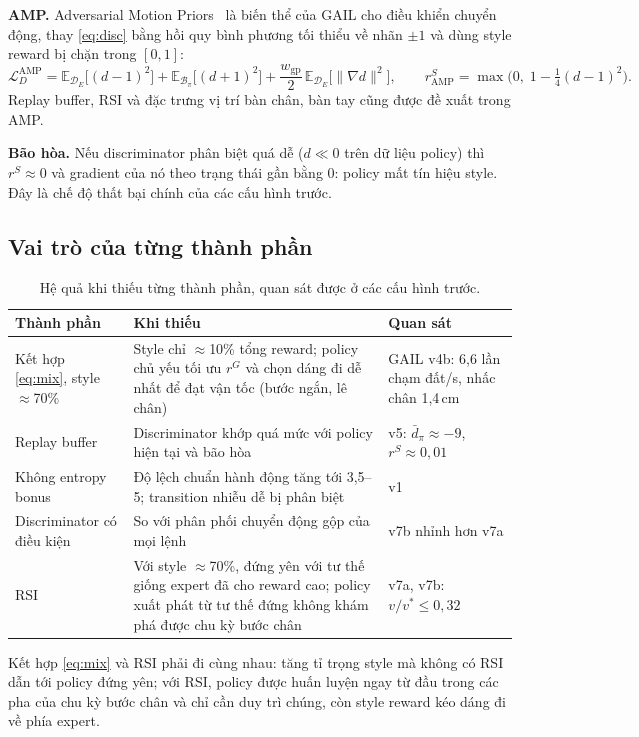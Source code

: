 \documentclass[11pt,a4paper]{article}
\newcommand{\E}{\mathbb{E}}
\begin{document}
\textbf{AMP.} Adversarial Motion Priors~\cite{peng2021amp} là biến thể của GAIL cho điều
khiển chuyển động, thay \eqref{eq:disc} bằng hồi quy bình phương tối thiểu về nhãn $\pm 1$
và dùng style reward bị chặn trong $[0, 1]$:
\begin{equation}
  \mathcal{L}_D^\text{AMP} = \E_{\mathcal{D}_E}\big[(d - 1)^2\big]
  + \E_{\mathcal{B}_\pi}\big[(d + 1)^2\big] + \frac{w_\text{gp}}{2}\,
  \E_{\mathcal{D}_E}\big[\|\nabla d\|^2\big],
  \qquad
  r^S_\text{AMP} = \max\big(0,\; 1 - \tfrac14 (d - 1)^2\big).
  \label{eq:amp}
\end{equation}
Replay buffer, RSI và đặc trưng vị trí bàn chân, bàn tay cũng được đề xuất trong AMP.

\textbf{Bão hòa.} Nếu discriminator phân biệt quá dễ ($d \ll 0$ trên dữ liệu policy) thì
$r^S \approx 0$ và gradient của nó theo trạng thái gần bằng 0: policy mất tín hiệu style.
Đây là chế độ thất bại chính của các cấu hình trước.

\subsection{Vai trò của từng thành phần}
\begin{table}[H]
\centering
\caption{Hệ quả khi thiếu từng thành phần, quan sát được ở các cấu hình trước.}
\label{tab:roles}
\small
\begin{tabular}{@{}p{3.0cm}p{6.8cm}p{3.9cm}@{}}
\toprule
Thành phần & Khi thiếu & Quan sát \\
\midrule
Kết hợp \eqref{eq:mix}, style $\approx$70\% & Style chỉ $\approx$10\% tổng reward; policy
chủ yếu tối ưu $r^G$ và chọn dáng đi dễ nhất để đạt vận tốc (bước ngắn, lê chân) &
GAIL v4b: 6,6 lần chạm đất/s, nhấc chân 1,4\,cm \\
Replay buffer & Discriminator khớp quá mức với policy hiện tại và bão hòa & v5:
$\bar d_\pi \approx -9$, $r^S \approx 0{,}01$ \\
Không entropy bonus & Độ lệch chuẩn hành động tăng tới 3,5--5; transition nhiễu dễ bị
phân biệt & v1 \\
Discriminator có điều kiện & So với phân phối chuyển động gộp của mọi lệnh & v7b nhỉnh
hơn v7a \\
RSI & Với style $\approx$70\%, đứng yên với tư thế giống expert đã cho reward cao; policy
xuất phát từ tư thế đứng không khám phá được chu kỳ bước chân & v7a, v7b: $v/v^* \le
0{,}32$ \\
\bottomrule
\end{tabular}
\end{table}
Kết hợp \eqref{eq:mix} và RSI phải đi cùng nhau: tăng tỉ trọng style mà không có RSI dẫn
tới policy đứng yên; với RSI, policy được huấn luyện ngay từ đầu trong các pha của chu kỳ
bước chân và chỉ cần duy trì chúng, còn style reward kéo dáng đi về phía expert.
\end{document}
